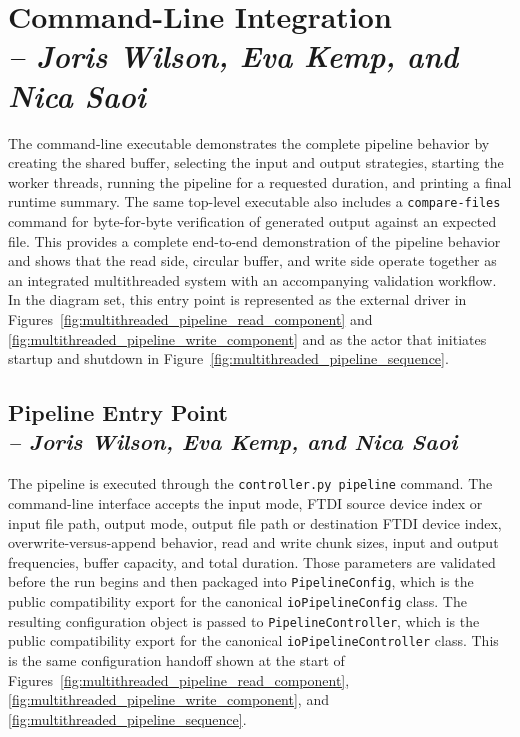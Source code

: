 \section{Command-Line Integration \\
\small{\textit{-- Joris Wilson, Eva Kemp, and Nica Saoi}}}
\label{Section::Command-Line Integration}

The command-line executable demonstrates the complete pipeline behavior by creating the shared buffer, selecting the input and output strategies, starting the worker threads, running the pipeline for a requested duration, and printing a final runtime summary. The same top-level executable also includes a \texttt{compare-files} command for byte-for-byte verification of generated output against an expected file. This provides a complete end-to-end demonstration of the pipeline behavior and shows that the read side, circular buffer, and write side operate together as an integrated multithreaded system with an accompanying validation workflow. In the diagram set, this entry point is represented as the external driver in Figures~\ref{fig:multithreaded_pipeline_read_component} and \ref{fig:multithreaded_pipeline_write_component} and as the actor that initiates startup and shutdown in Figure~\ref{fig:multithreaded_pipeline_sequence}.

\subsection{Pipeline Entry Point \\
\small{\textit{-- Joris Wilson, Eva Kemp, and Nica Saoi}}}
\label{Section::Pipeline Entry Point}

The pipeline is executed through the \texttt{controller.py pipeline} command. The command-line interface accepts the input mode, FTDI source device index or input file path, output mode, output file path or destination FTDI device index, overwrite-versus-append behavior, read and write chunk sizes, input and output frequencies, buffer capacity, and total duration. Those parameters are validated before the run begins and then packaged into \texttt{PipelineConfig}, which is the public compatibility export for the canonical \texttt{ioPipelineConfig} class. The resulting configuration object is passed to \texttt{PipelineController}, which is the public compatibility export for the canonical \texttt{ioPipelineController} class. This is the same configuration handoff shown at the start of Figures~\ref{fig:multithreaded_pipeline_read_component}, \ref{fig:multithreaded_pipeline_write_component}, and \ref{fig:multithreaded_pipeline_sequence}.

